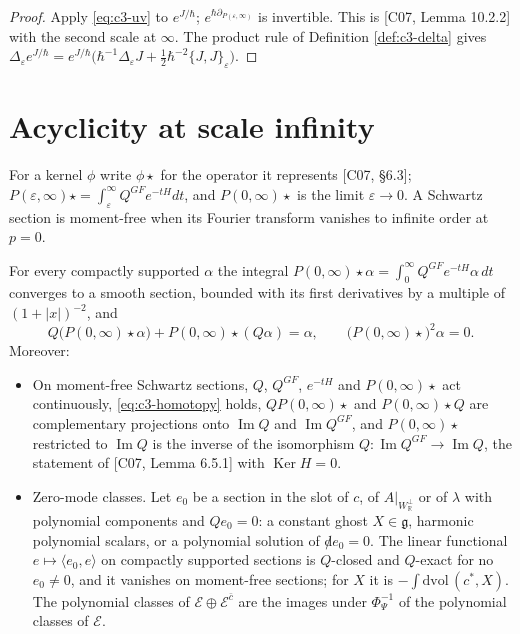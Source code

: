 \begin{proof}
Apply \eqref{eq:c3-uv} to $e^{J/\hbar}$; $e^{\hbar\partial_{P(\varepsilon,\infty)}}$ is invertible. This is [C07, Lemma 10.2.2] with the second scale at $\infty$. The product rule of Definition \ref{def:c3-delta} gives $\Delta_\varepsilon e^{J/\hbar}=e^{J/\hbar}\big(\hbar^{-1}\Delta_\varepsilon J+\tfrac12\hbar^{-2}\{J,J\}_\varepsilon\big)$.
\end{proof}

\section{Acyclicity at scale infinity}

For a kernel $\phi$ write $\phi\star$ for the operator it represents [C07, §6.3]; $P(\varepsilon,\infty)\star=\int_\varepsilon^\infty Q^{GF}e^{-tH}dt$, and $P(0,\infty)\star$ is the limit $\varepsilon\to0$. A Schwartz section is moment-free when its Fourier transform vanishes to infinite order at $p=0$.

\begin{theorem}
\label{thm:c3-acyclic}
For every compactly supported $\alpha$ the integral $P(0,\infty)\star\alpha=\int_0^\infty Q^{GF}e^{-tH}\alpha\,dt$ converges to a smooth section, bounded with its first derivatives by a multiple of $(1+|x|)^{-2}$, and
\begin{equation}
Q\big(P(0,\infty)\star\alpha\big)+P(0,\infty)\star(Q\alpha)=\alpha,\qquad \big(P(0,\infty)\star\big)^2\alpha=0 .
\label{eq:c3-homotopy}
\end{equation}
Moreover:
\begin{itemize}
\item On moment-free Schwartz sections, $Q$, $Q^{GF}$, $e^{-tH}$ and $P(0,\infty)\star$ act continuously, \eqref{eq:c3-homotopy} holds, $QP(0,\infty)\star$ and $P(0,\infty)\star Q$ are complementary projections onto $\operatorname{Im}Q$ and $\operatorname{Im}Q^{GF}$, and $P(0,\infty)\star$ restricted to $\operatorname{Im}Q$ is the inverse of the isomorphism $Q\colon\operatorname{Im}Q^{GF}\to\operatorname{Im}Q$, the statement of [C07, Lemma 6.5.1] with $\operatorname{Ker}H=0$.
\item Zero-mode classes. Let $e_0$ be a section in the slot of $c$, of $A|_{W_{\mathbb R}^\perp}$ or of $\lambda$ with polynomial components and $Qe_0=0$: a constant ghost $X\in\mathfrak g$, harmonic polynomial scalars, or a polynomial solution of ${\not d}e_0=0$. The linear functional $e\mapsto\langle e_0,e\rangle$ on compactly supported sections is $Q$-closed and $Q$-exact for no $e_0\neq0$, and it vanishes on moment-free sections; for $X$ it is $-\int\mathrm{dvol}\,(c^*,X)$. The polynomial classes of $\mathscr E\oplus\mathscr E^{\bar c}$ are the images under $\Phi_\Psi^{-1}$ of the polynomial classes of $\mathscr E$.
\end{itemize}
\end{theorem}

